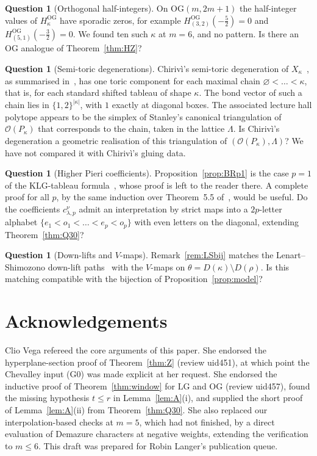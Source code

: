 \documentclass[11pt]{amsart}
\theoremstyle{definition}
\newtheorem{question}[theorem]{Question}
\theoremstyle{remark}
\newcommand{\LG}{\mathrm{LG}}
\newcommand{\OG}{\mathrm{OG}}
\newcommand{\HOG}{H^{\OG}}
\newcommand{\ord}{\mathcal{O}}
\begin{document}
\begin{question}[Orthogonal half-integers]
On $\OG(m,2m+1)$ the half-integer values of $\HOG_\kappa$ have sporadic zeros, for example
$\HOG_{(3,2)}(-\tfrac52)=0$ and $\HOG_{(5,1)}(-\tfrac32)=0$. We found ten such $\kappa$ at
$m=6$, and no pattern. Is there an $\OG$ analogue of Theorem~\ref{thm:HZ}?
\end{question}

\begin{question}[Semi-toric degenerations]
Chirivì's semi-toric degeneration of $X_\kappa$~\cite{Chi00}, as summarised in~\cite[\S7]{CCFL},
has one toric component for each maximal chain $\varnothing<\dots<\kappa$, that is, for each
standard shifted tableau of shape $\kappa$. The bond vector of such a chain lies in
$\{1,2\}^{|\kappa|}$, with $1$ exactly at diagonal boxes. The associated lecture hall polytope
appears to be the simplex of Stanley's canonical triangulation of $\ord(P_\kappa)$ that
corresponds to the chain, taken in the lattice $\Lambda$. Is Chirivì's degeneration a geometric
realisation of this triangulation of $(\ord(P_\kappa),\Lambda)$? We have not compared it with
Chirivì's gluing data.
\end{question}

\begin{question}[Higher Pieri coefficients]
Proposition~\ref{prop:BRp1} is the case $p=1$ of the KLG-tableau formula~\cite[Cor.~5.6]{BR12},
whose proof is left to the reader there. A complete proof for all $p$, by the same induction
over Theorem~5.5 of~\cite{BR12}, would be useful. Do the coefficients
$c^\nu_{\lambda,p}$ admit an interpretation by strict maps into a $2p$-letter alphabet
$\{e_1<o_1<\dots<e_p<o_p\}$ with even letters on the diagonal, extending
Theorem~\ref{thm:Q30}?
\end{question}

\begin{question}[Down-lifts and $V$-maps]
Remark~\ref{rem:LSbij} matches the Lenart--Shimozono down-lift paths~\cite[(3.6)]{LS12} with the $V$-maps on
$\theta=D(\kappa)\setminus D(\rho)$. Is this matching compatible with the bijection of Proposition~\ref{prop:model}?
\end{question}

\section*{Acknowledgements}
Clio Vega refereed the core arguments of this paper. She endorsed the hyperplane-section proof
of Theorem~\ref{thm:Z} (review uid451), at which point the Chevalley input (G0) was made
explicit at her request. She endorsed the inductive proof of Theorem~\ref{thm:window} for $\LG$
and $\OG$ (review uid457), found the missing hypothesis $t\le r$ in Lemma~\ref{lem:A}(i), and
supplied the short proof of Lemma~\ref{lem:A}(ii) from Theorem~\ref{thm:Q30}. She also replaced
our interpolation-based checks at $m=5$, which had not finished, by a direct evaluation of
Demazure characters at negative weights, extending the verification to $m\le6$. This draft was
prepared for Robin Langer's publication queue.



\end{document}
